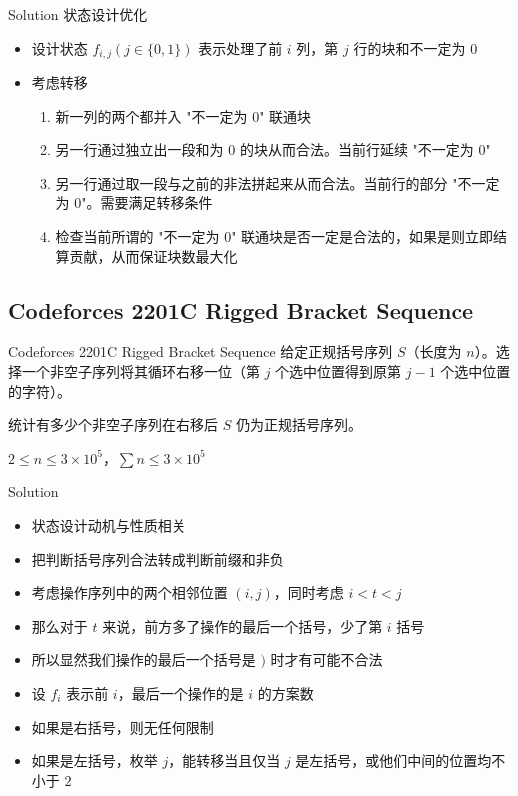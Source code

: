 ﻿\documentclass[aspectratio=169]{ctexbeamer}
\begin{document}
\begin{frame}{Solution}
    状态设计优化
    \begin{itemize}
        \item 设计状态 $f_{i,j}(j\in\{0,1\})$ 表示处理了前 $i$ 列，第 $j$ 行的块和不一定为 $ 0 $
        \item 考虑转移
        \begin{enumerate}
            \item 新一列的两个都并入 "不一定为 $ 0 $" 联通块
            \item 另一行通过独立出一段和为 $ 0 $ 的块从而合法。当前行延续 "不一定为 $ 0 $"
            \item 另一行通过取一段与之前的非法拼起来从而合法。当前行的部分 "不一定为 $ 0 $"。需要满足转移条件
            \item 检查当前所谓的 "不一定为 $ 0 $" 联通块是否一定是合法的，如果是则立即结算贡献，从而保证块数最大化
        \end{enumerate}
    \end{itemize}
\end{frame}




\subsection{Codeforces 2201C Rigged Bracket Sequence}

\begin{frame}{Codeforces 2201C Rigged Bracket Sequence}
      给定正规括号序列 $S$（长度为 $n$）。选择一个非空子序列将其循环右移一位（第 $j$ 个选中位置得到原第 $j-1$ 个选中位置的字符）。
      
      统计有多少个非空子序列在右移后 $S$ 仍为正规括号序列。
      
      $2\le n\le 3\times 10^5$，$\sum n\le 3\times 10^5$
\end{frame}

\begin{frame}{Solution}
    \begin{itemize}
        \item 状态设计动机与性质相关
        \item 把判断括号序列合法转成判断前缀和非负
        \item 考虑操作序列中的两个相邻位置 $(i,j)$，同时考虑 $i<t<j$
        \item 那么对于 $t$ 来说，前方多了操作的最后一个括号，少了第 $i$ 括号
        \item 所以显然我们操作的最后一个括号是 $)$ 时才有可能不合法
        \item 设 $f_i$ 表示前 $i$，最后一个操作的是 $i$ 的方案数
        \item 如果是右括号，则无任何限制
        \item 如果是左括号，枚举 $j$，能转移当且仅当 $j$ 是左括号，或他们中间的位置均不小于 $2$
    \end{itemize}
\end{frame}
\end{document}
